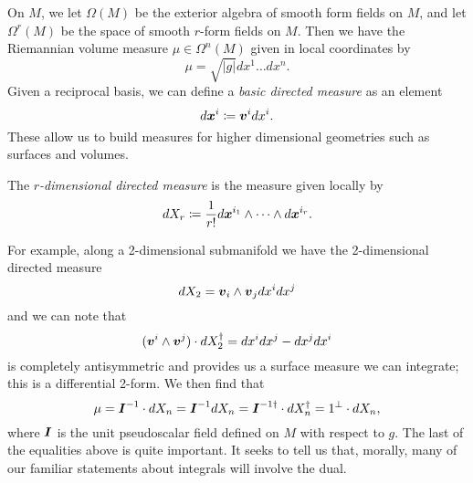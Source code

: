 On $M$, we let $\Omega(M)$ be the exterior algebra of smooth form fields on $M$, and let $\Omega^r(M)$ be the space of smooth $r$-form fields on $M$. Then we have the Riemannian volume measure $\mu \in \Omega^n(M)$ given in local coordinates by
\begin{equation}
\mu = \sqrt{|g|} dx^1\dots dx^n.
\end{equation}
Given a reciprocal basis, we can define a \emph{basic directed measure} as an element 
\begin{equation}
d\boldsymbol{x}^i \coloneqq \boldsymbol{v}^i dx^i.
\end{equation}
These allow us to build measures for higher dimensional geometries such as surfaces and volumes.
\begin{definition}
The \emph{$r$-dimensional directed measure} is the measure given locally by 
\begin{equation}
    dX_r \coloneqq \frac{1}{r!} d\boldsymbol{x}^{i_1}\wedge \cdots \wedge d\boldsymbol{x}^{i_r}.
\end{equation}
\end{definition}
For example, along a 2-dimensional submanifold we have the 2-dimensional directed measure 
\begin{equation}
    dX_2 = \boldsymbol{v}_i \wedge \boldsymbol{v}_j dx^i dx^j
\end{equation}
and we can note that 
\begin{equation}
(\boldsymbol{v}^i \wedge \boldsymbol{v}^j)\cdot dX_2^\dagger = dx^idx^j - dx^j dx^i
\end{equation}
is completely antisymmetric and provides us a surface measure we can integrate; this is a differential 2-form. We then find that
\begin{equation}
\label{eq:volume_form}
\mu = \boldsymbol{I}^{-1} \cdot dX_n = \boldsymbol{I}^{-1} dX_n = \boldsymbol{I}^{-1 \dagger} \cdot dX_n^\dagger = 1^\perp \cdot dX_n,
\end{equation}
where $\boldsymbol{I}$ is the unit pseudoscalar field defined on $M$ with respect to $g$. The last of the equalities above is quite important. It seeks to tell us that, morally, many of our familiar statements about integrals will involve the dual.

